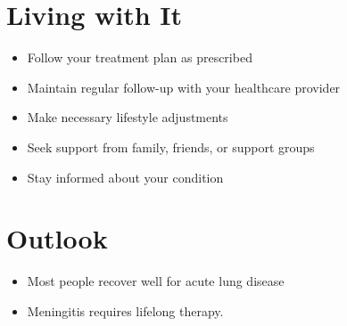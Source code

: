 \section{Living with It}
\begin{itemize}[noitemsep]
  \item Follow your treatment plan as prescribed
  \item Maintain regular follow-up with your healthcare provider
  \item Make necessary lifestyle adjustments
  \item Seek support from family, friends, or support groups
  \item Stay informed about your condition
\end{itemize}
\section{Outlook}
\begin{itemize}[noitemsep]
  \item Most people recover well for acute lung disease
  \item Meningitis requires lifelong therapy.
\end{itemize}
